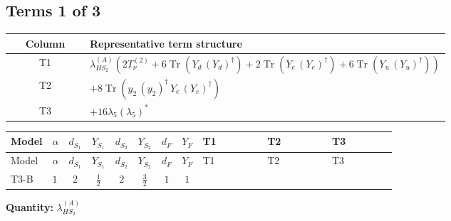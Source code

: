 \documentclass[8pt]{article}
\begin{document}
\begin{landscape}
\subsection*{Terms 1 of 3}
\begin{center}
\begin{tabular}{@{}c >{\raggedright\arraybackslash}p{0.82\linewidth}@{}}
\toprule
Column & Representative term structure \\
\midrule
T1 & \(\displaystyle {\lambda_{HS_2}^{(A)}} (2 T_{\nu}^{(2)}+6 \operatorname{Tr}\!\left({Y_d}\,\left({Y_d}\right)^{\dagger}\right)+2 \operatorname{Tr}\!\left({Y_e}\,\left({Y_e}\right)^{\dagger}\right)+6 \operatorname{Tr}\!\left({Y_u}\,\left({Y_u}\right)^{\dagger}\right))\) \\
\midrule
T2 & \(\displaystyle +8 \operatorname{Tr}\!\left({y_2}\,\left({y_2}\right)^{\dagger}\,{Y_e}\,\left({Y_e}\right)^{\dagger}\right)\) \\
\midrule
T3 & \(\displaystyle +16 {\lambda_5} \left({\lambda_5}\right)^{*}\) \\
\midrule
\bottomrule
\end{tabular}
\end{center}
\smallskip
\tiny
\begin{longtable}{@{}llcccccc >{\raggedright\arraybackslash}p{0.21\linewidth} >{\raggedright\arraybackslash}p{0.21\linewidth} >{\raggedright\arraybackslash}p{0.21\linewidth}@{}}
\toprule
Model & $\alpha$ & $d_{S_1}$ & $Y_{S_1}$ & $d_{S_2}$ & $Y_{S_2}$ & $d_F$ & $Y_F$ & T1 & T2 & T3 \\
\midrule
\endfirsthead
\toprule
Model & $\alpha$ & $d_{S_1}$ & $Y_{S_1}$ & $d_{S_2}$ & $Y_{S_2}$ & $d_F$ & $Y_F$ & T1 & T2 & T3 \\
\midrule
\endhead
T3-B & $1$ & $2$ & $\frac{1}{2}$ & $2$ & $\frac{3}{2}$ & $1$ & $1$ & \scriptsize\adjustbox{max width=\linewidth}{$\begin{gathered} {\lambda_{HS_2}^{(A)}} (2 T_{\nu}^{(2)}+6 \operatorname{Tr}\!\left({Y_d}\,\left({Y_d}\right)^{\dagger}\right)+2 \operatorname{Tr}\!\left({Y_e}\,\left({Y_e}\right)^{\dagger}\right)+6 \operatorname{Tr}\!\left({Y_u}\,\left({Y_u}\right)^{\dagger}\right))\end{gathered}$} & \scriptsize\adjustbox{max width=\linewidth}{$\begin{gathered} +8 \operatorname{Tr}\!\left({y_2}\,\left({y_2}\right)^{\dagger}\,{Y_e}\,\left({Y_e}\right)^{\dagger}\right)\end{gathered}$} & \scriptsize\adjustbox{max width=\linewidth}{$\begin{gathered} +16 {\lambda_5} \left({\lambda_5}\right)^{*}\end{gathered}$} \\
\midrule
\bottomrule
\end{longtable}
\clearpage
\noindent\textbf{Quantity: }$\lambda_{HS_2}^{(A)}$\par\smallskip

\end{landscape}
\end{document}
